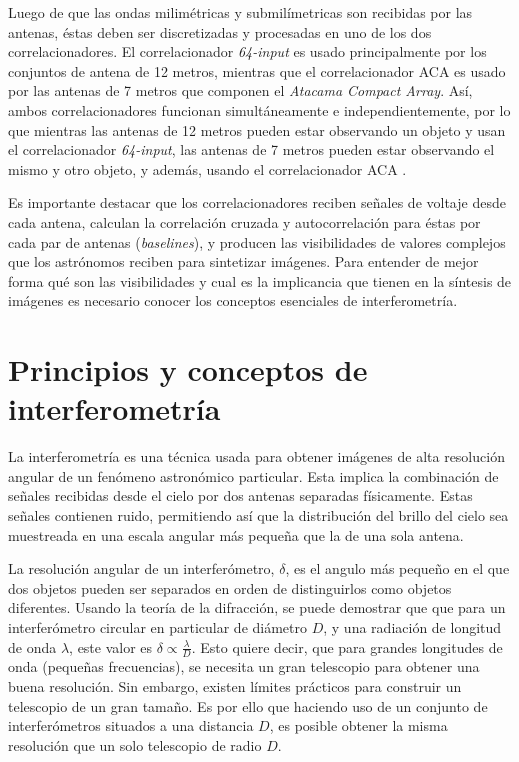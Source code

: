 Luego de que las ondas milimétricas y submilímetricas son recibidas por las antenas, éstas deben ser discretizadas y procesadas en uno de los dos correlacionadores. El correlacionador \textit{64-input} es usado principalmente por los conjuntos de antena de 12 metros, mientras que el correlacionador ACA es usado por las antenas de 7 metros que componen el \textit{Atacama Compact Array}. Así, ambos correlacionadores funcionan simultáneamente e independientemente, por lo que mientras las antenas de 12 metros pueden estar observando un objeto y usan el correlacionador \textit{64-input}, las antenas de 7 metros pueden estar observando el mismo y otro objeto, y además, usando el correlacionador ACA \citep{alma-handbook}. 

Es importante destacar que los correlacionadores reciben señales de voltaje desde cada antena, calculan la correlación cruzada y autocorrelación para éstas por cada par de antenas (\textit{baselines}), y producen las visibilidades de valores complejos que los astrónomos reciben para sintetizar imágenes. Para entender de mejor forma qué son las visibilidades y cual es la implicancia que tienen en la síntesis de imágenes es necesario conocer los conceptos esenciales de interferometría.

\section{Principios y conceptos de interferometría}

La interferometría es una técnica usada para obtener imágenes de alta resolución angular de un fenómeno astronómico particular. Esta implica la combinación de señales recibidas desde el cielo por dos antenas separadas físicamente. Estas señales contienen ruido, permitiendo así que la distribución del brillo del cielo sea muestreada en una escala angular más pequeña que la de una sola antena. 

La resolución angular de un interferómetro, $\delta$, es el angulo más pequeño en el que dos objetos pueden ser separados en orden de distinguirlos como objetos diferentes. Usando la teoría de la difracción, se puede demostrar que que para un interferómetro circular en particular de diámetro $D$, y una radiación de longitud de onda $\lambda$, este valor es $\delta \propto \frac{\lambda}{D}$. Esto quiere decir, que para grandes longitudes de onda (pequeñas frecuencias), se necesita un gran telescopio para obtener una buena resolución. Sin embargo, existen límites prácticos para construir un telescopio de un gran tamaño. Es por ello que haciendo uso de un conjunto de interferómetros situados a una distancia $D$, es posible obtener la misma resolución que un solo telescopio de radio $D$.



